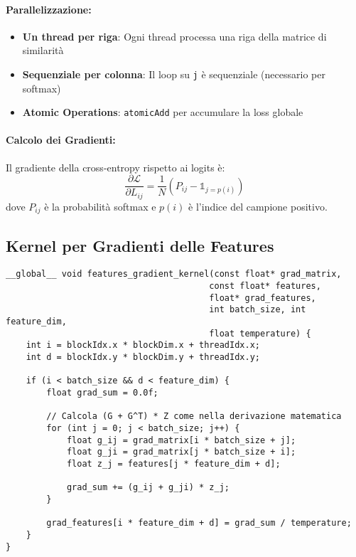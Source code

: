 \documentclass[a4paper,11pt]{article}
\begin{document}
\paragraph{Parallelizzazione:}
\begin{itemize}
    \item \textbf{Un thread per riga}: Ogni thread processa una riga della matrice di similarità
    \item \textbf{Sequenziale per colonna}: Il loop su \texttt{j} è sequenziale (necessario per softmax)
    \item \textbf{Atomic Operations}: \texttt{atomicAdd} per accumulare la loss globale
\end{itemize}

\paragraph{Calcolo dei Gradienti:}
Il gradiente della cross-entropy rispetto ai logits è:
\begin{equation}
\frac{\partial \mathcal{L}}{\partial L_{ij}} = \frac{1}{N}(P_{ij} - \mathbb{1}_{j=p(i)})
\end{equation}
dove $P_{ij}$ è la probabilità softmax e $p(i)$ è l'indice del campione positivo.

\subsection{Kernel per Gradienti delle Features}

\begin{lstlisting}[caption={Kernel per calcolo gradienti features}]
__global__ void features_gradient_kernel(const float* grad_matrix, 
                                        const float* features,
                                        float* grad_features, 
                                        int batch_size, int feature_dim,
                                        float temperature) {
    int i = blockIdx.x * blockDim.x + threadIdx.x;
    int d = blockIdx.y * blockDim.y + threadIdx.y;
    
    if (i < batch_size && d < feature_dim) {
        float grad_sum = 0.0f;
        
        // Calcola (G + G^T) * Z come nella derivazione matematica
        for (int j = 0; j < batch_size; j++) {
            float g_ij = grad_matrix[i * batch_size + j];
            float g_ji = grad_matrix[j * batch_size + i];
            float z_j = features[j * feature_dim + d];
            
            grad_sum += (g_ij + g_ji) * z_j;
        }
        
        grad_features[i * feature_dim + d] = grad_sum / temperature;
    }
}
\end{lstlisting}
\end{document}
